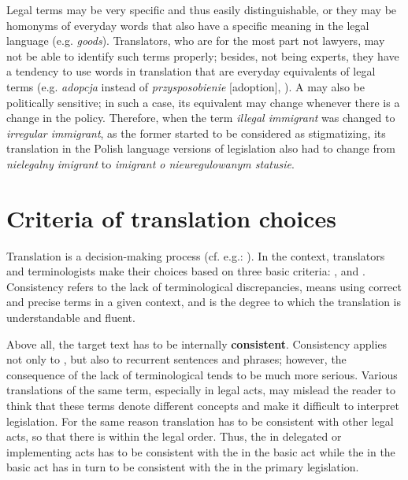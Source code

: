 \documentclass[output=paper]{langsci/langscibook}
\begin{document}
\largerpage%
Legal terms may be very specific and thus easily distinguishable, or they may be homonyms of everyday words that also have a specific meaning in the legal language (e.g. \textit{goods}). Translators, who are for the most part not lawyers, may not be able to identify such terms properly; besides, not being experts, they have a tendency to use words in translation that are everyday equivalents of legal terms (e.g. \textit{adopcja} instead of \textit{przysposobienie} [adoption], \citealt[273]{Biel2014}). A  may also be politically sensitive; in such a case, its equivalent may change whenever there is a change in the  policy. Therefore, when the term \textit{illegal immigrant} was changed to \textit{irregular immigrant}, as the former started to be considered as stigmatizing, its translation in the Polish language versions of  legislation also had to change from \textit{nielegalny imigrant} to {\textit{imigrant o nieuregulowanym statusie}}.

\section{Criteria of translation choices}\label{sec:stefaniak:3}
\largerpage
Translation is a decision-making process (cf. e.g.: \citealt{Levý1967}). In the  context, translators and terminologists make their choices based on three basic criteria: ,  and . Consistency refers to the lack of terminological discrepancies,  means using correct and precise terms in a given context, and  is the degree to which the translation is understandable and fluent.

Above all, the target text has to be internally \textbf{consistent}. Consistency applies not only to , but also to recurrent sentences and phrases; however, the consequence of the lack of terminological  tends to be much more serious. Various translations of the same term, especially in legal acts, may mislead the reader to think that these terms denote different concepts and make it difficult to interpret legislation. For the same reason translation has to be consistent with other  legal acts, so that there is  within the  legal order. Thus, the  in delegated or implementing acts has to be consistent with the  in the basic act while the  in the basic act has in turn to be consistent with the  in the primary legislation. 
\end{document}
